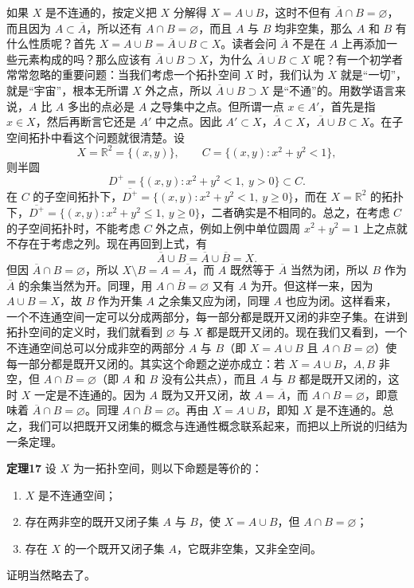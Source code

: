 如果 $X$ 是不连通的，按定义把 $X$ 分解得 $X=A\cup B$，这时不但有 $\overline A\cap B=\varnothing$，而且因为 $A\subset\overline A$，所以还有 $A\cap B=\varnothing$，而且 $A$ 与 $B$ 均非空集，那么 $A$ 和 $B$ 有什么性质呢？首先 $X=A\cup B=\overline A\cup B\subset X$。读者会问 $\overline A$ 不是在 $A$ 上再添加一些元素构成的吗？那么应该有 $\overline A\cup B\supset X$，为什么 $\overline A\cup B\subset X$ 呢？有一个初学者常常忽略的重要问题：当我们考虑一个拓扑空间 $X$ 时，我们认为 $X$ 就是“一切”，就是“宇宙”，根本无所谓 $X$ 外之点，所以 $\overline A\cup B\supset X$ 是“不通”的。用数学语言来说，$A$ 比 $A$ 多出的点必是 $A$ 之导集中之点。但所谓一点 $x\in A'$，首先是指 $x\in X$，然后再断言它还是 $A'$ 中之点。因此 $A'\subset X$，$\overline A\subset X$，$\overline A\cup B\subset X$。在子空间拓扑中看这个问题就很清楚。设
\[
 X=\mathbb R^2=\{(x,y)\},\qquad C=\{(x,y):x^2+y^2<1\},
\]
则半圆
\[
 D^+=\{(x,y):x^2+y^2<1,\ y>0\}\subset C.
\]
在 $C$ 的子空间拓扑下，$\overline{D^+}=\{(x,y):x^2+y^2<1,\ y\ge0\}$，而在 $X=\mathbb R^2$ 的拓扑下，$\overline{D^+}=\{(x,y):x^2+y^2\le1,\ y\ge0\}$，二者确实是不相同的。总之，在考虑 $C$ 的子空间拓扑时，不能考虑 $C$ 外之点，例如上例中单位圆周 $x^2+y^2=1$ 上之点就不存在于考虑之列。现在再回到上式，有
\[
 \overline A\cup B=\overline A\cup\overline B=X.
\]
但因 $\overline A\cap B=\varnothing$，所以 $X\setminus B=A=\overline A$，而 $A$ 既然等于 $\overline A$ 当然为闭，所以 $B$ 作为 $\overline A$ 的余集当然为开。同理，用 $A\cap\overline B=\varnothing$ 又有 $A$ 为开。但这样一来，因为 $A\cup B=X$，故 $B$ 作为开集 $A$ 之余集又应为闭，同理 $A$ 也应为闭。这样看来，一个不连通空间一定可以分成两部分，每一部分都是既开又闭的非空子集。在讲到拓扑空间的定义时，我们就看到 $\varnothing$ 与 $X$ 都是既开又闭的。现在我们又看到，一个不连通空间总可以分成非空的两部分 $A$ 与 $B$（即 $X=A\cup B$ 且 $A\cap B=\varnothing$）使每一部分都是既开又闭的。其实这个命题之逆亦成立：若 $X=A\cup B$，$A,B$ 非空，但 $A\cap B=\varnothing$（即 $A$ 和 $B$ 没有公共点），而且 $A$ 与 $B$ 都是既开又闭的，这时 $X$ 一定是不连通的。因为 $A$ 既为又开又闭，故 $A=\overline A$，而 $A\cap B=\varnothing$，即意味着 $\overline A\cap B=\varnothing$。同理 $A\cap\overline B=\varnothing$。再由 $X=A\cup B$，即知 $X$ 是不连通的。总之，我们可以把既开又闭集的概念与连通性概念联系起来，而把以上所说的归结为一条定理。

\noindent\textbf{定理17}\quad
设 $X$ 为一拓扑空间，则以下命题是等价的：
\begin{enumerate}[label=(\roman*)]
\item $X$ 是不连通空间；
\item 存在两非空的既开又闭子集 $A$ 与 $B$，使 $X=A\cup B$，但 $A\cap B=\varnothing$；
\item 存在 $X$ 的一个既开又闭子集 $A$，它既非空集，又非全空间。
\end{enumerate}
证明当然略去了。


